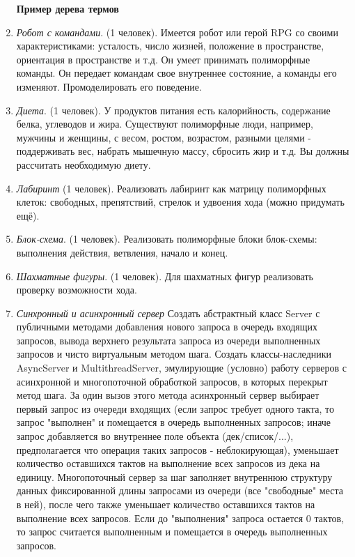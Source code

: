 \documentclass[12pt]{report}
\begin{document}
\begin{enumerate}
\begin{center}
    \textbf{Пример дерева термов}
   \end{center}

  \item \emph{Робот с командами}. (1 человек). Имеется робот или герой RPG со своими характеристиками: усталость, число жизней,
  положение в пространстве, ориентация в пространстве и т.д. Он умеет принимать полиморфные команды. Он передает командам свое 
  внутреннее состояние, а команды его изменяют. Промоделировать его поведение.
  \item \emph{Диета}. (1 человек). У продуктов питания есть калорийность, содержание белка, углеводов и жира. Существуют полиморфные
  люди, например, мужчины и женщины, с весом, ростом, возрастом, разными целями - поддерживать вес, набрать мышечную массу, сбросить
  жир и т.д. Вы должны рассчитать необходимую диету.
  \item \emph{Лабиринт} (1 человек). Реализовать лабиринт как матрицу полиморфных клеток: свободных, препятствий, 
стрелок и удвоения хода (можно придумать ещё).
  \item \emph{Блок-схема}. (1 человек). Реализовать полиморфные блоки блок-схемы: выполнения действия, ветвления, 
начало и конец.
  \item \emph{Шахматные фигуры}. (1 человек). Для шахматных фигур реализовать 
проверку возможности хода.
 \item \emph{Синхронный и асинхронный сервер} Создать абстрактный класс Server 
с публичными методами добавления нового запроса в очередь входящих запросов, 
вывода верхнего результата запроса из очереди выполненных запросов и чисто 
виртуальным методом шага.
Создать классы-наследники AsyncServer и MultithreadServer, эмулирующие (условно) 
работу серверов с асинхронной и многопоточной обработкой запросов, в которых 
перекрыт метод шага. За один вызов этого метода асинхронный сервер выбирает 
первый запрос из очереди входящих (если запрос требует одного такта, то запрос 
"выполнен" и помещается в очередь выполненных запросов; иначе запрос добавляется 
во внутреннее поле объекта (дек/список/...), предполагается что операция таких 
запросов - неблокирующая), уменьшает количество оставшихся тактов на выполнение 
всех запросов из дека на единицу. Многопоточный сервер за шаг заполняет 
внутреннюю структуру данных фиксированной длины запросами из очереди (все 
"свободные" места в ней), после чего также уменьшает количество оставшихся 
тактов на выполнение всех запросов.
Если до "выполнения" запроса остается 0 тактов, то запрос считается выполненным 
и помещается в очередь выполненных запросов.

\end{enumerate}
\end{document}
